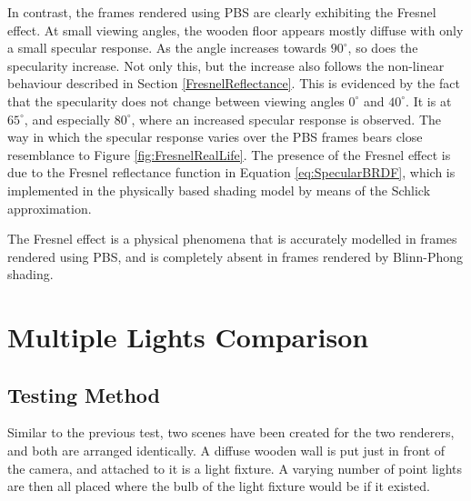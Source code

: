 In contrast, the frames rendered using PBS are clearly exhibiting the Fresnel effect. At small viewing angles, the wooden floor appears mostly diffuse with only a small specular response. As the angle increases towards \begin{math}90^{\circ}\end{math}, so does the specularity increase. Not only this, but the increase also follows the non-linear behaviour described in Section \ref{FresnelReflectance}. This is evidenced by the fact that the specularity does not change between viewing angles \begin{math}0^{\circ}\end{math} and \begin{math}40^{\circ}\end{math}. It is at \begin{math}65^{\circ}\end{math}, and especially \begin{math}80^{\circ}\end{math}, where an increased specular response is observed. The way in which the specular response varies over the PBS frames bears close resemblance to Figure \ref{fig:FresnelRealLife}. The presence of the Fresnel effect is due to the Fresnel reflectance function in Equation \ref{eq:SpecularBRDF}, which is implemented in the physically based shading model by means of the Schlick approximation.

The Fresnel effect is a physical phenomena that is accurately modelled in frames rendered using PBS, and is completely absent in frames rendered by Blinn-Phong shading.

\section{Multiple Lights Comparison} \label{MultipleLightsComparison}

\subsection{Testing Method}

Similar to the previous test, two scenes have been created for the two renderers, and both are arranged identically. A diffuse wooden wall is put just in front of the camera, and attached to it is a light fixture. A varying number of point lights are then all placed where the bulb of the light fixture would be if it existed.

